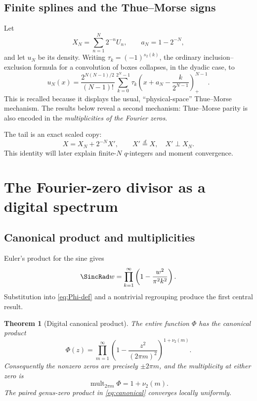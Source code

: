 \documentclass[11pt,oneside]{article}
\newtheorem{theorem}{Theorem}[section]
\theoremstyle{definition}
\theoremstyle{remark}
\begin{document}
\subsection{Finite splines and the Thue--Morse signs}

Let
\[
 X_N=\sum_{n=1}^{N}2^{-n}U_n,
 \qquad
 a_N=1-2^{-N},
\]
and let \(u_N\) be its density.  Writing
\(\tau_k=(-1)^{s_2(k)}\), the ordinary inclusion--exclusion formula for a
convolution of boxes collapses, in the dyadic case, to
\begin{equation}
 u_N(x)=
 \frac{2^{N(N-1)/2}}{(N-1)!}
 \sum_{k=0}^{2^N-1}
 \tau_k
 \left(
   x+a_N-\frac{k}{2^{N-1}}
 \right)_{+}^{N-1}.
 \label{eq:finite-spline}
\end{equation}
This is recalled because it displays the usual, ``physical-space''
Thue--Morse mechanism.  The results below reveal a second mechanism:
Thue--Morse parity is also encoded in the \emph{multiplicities of the
Fourier zeros}.

The tail is an exact scaled copy:
\begin{equation}
 X=X_N+2^{-N}X',
 \qquad X'\stackrel d=X,\quad X'\perp X_N.
 \label{eq:tail-copy}
\end{equation}
This identity will later explain finite-\(N\) \(q\)-integers and moment
convergence.

\section{The Fourier-zero divisor as a digital spectrum}

\subsection{Canonical product and multiplicities}

Euler's product for the sine gives
\[
 \SincRad w=\prod_{k=1}^{\infty}\left(1-\frac{w^2}{\pi^2k^2}\right).
\]
Substitution into \eqref{eq:Phi-def} and a nontrivial regrouping produce the
first central result.

\begin{theorem}[Digital canonical product]
\label{thm:canonical}
The entire function \(\Phi\) has the canonical product
\begin{equation}
 \boxed{\displaystyle
 \Phi(z)=
 \prod_{m=1}^{\infty}
 \left(1-\frac{z^2}{(2\pi m)^2}\right)^{1+\nu_2(m)}.}
 \label{eq:canonical}
\end{equation}
Consequently the nonzero zeros are precisely \(\pm2\pi m\), and the
multiplicity at either zero is
\begin{equation}
 \operatorname{mult}_{2\pi m}\Phi=1+\nu_2(m).
 \label{eq:multiplicity}
\end{equation}
The paired genus-zero product in \eqref{eq:canonical} converges locally
uniformly.
\end{theorem}
\end{document}
